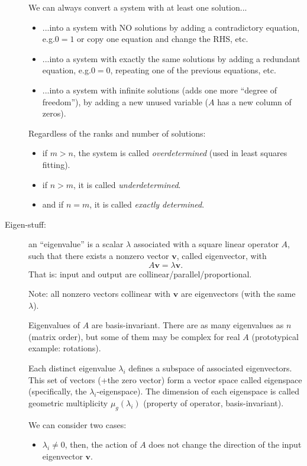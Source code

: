 \documentclass[
  12pt,
  paper=a4,
]{scrartcl} %
\begin{document}
\begin{description}
\begin{itemize}
\end{itemize}

We can always convert a system with at least one solution...
\begin{itemize}
    \item ...into a system with NO solutions by adding a contradictory equation, e.g.\@ $0=1$ or copy one equation and change the RHS, etc.
    \item ...into a system with exactly the same solutions by adding a redundant equation, e.g.\@ $0=0$, repeating one of the previous equations, etc.
    \item ...into a system with infinite solutions (adds one more ``degree of freedom''), by adding a new unused variable ($A$ has a new column of zeros).
\end{itemize}

Regardless of the ranks and number of solutions:
\begin{itemize}
    \item if $m>n$, the system is called \emph{overdetermined} (used in least squares fitting).
    \item if $n>m$, it is called \emph{underdetermined}.
    \item and if $n=m$, it is called \emph{exactly determined}.
\end{itemize}

\item[Eigen-stuff:] an ``eigenvalue'' is a scalar $\lambda$ associated with a square linear operator $A$, such that there exists a nonzero vector $\bm v$, called eigenvector, with \[
    \boxed{A\bm v = \lambda\bm v}.
\] 
That is: input and output are collinear/parallel/proportional.

Note: all nonzero vectors collinear with $\bm v$ are eigenvectors (with the same $\lambda$).

Eigenvalues of $A$ are basis-invariant. There are as many eigenvalues as $n$ (matrix order), but some of them may be complex for real $A$ (prototypical example: rotations).

Each distinct eigenvalue $\lambda_i$ defines a subspace of associated eigenvectors. This set of vectors (+the zero vector) form a vector space called eigenspace (specifically, the $\lambda_i$-eigenspace). The dimension of each eigenspace is called geometric multiplicity $\mu_g(\lambda_i)$ (property of operator, basis-invariant).

We can consider two cases:
\begin{itemize}
    \item $\lambda_i\neq 0$, then, the action of $A$ does not change the direction of the input eigenvector $\bm v$.


\end{itemize}
\end{description}
\end{document}
